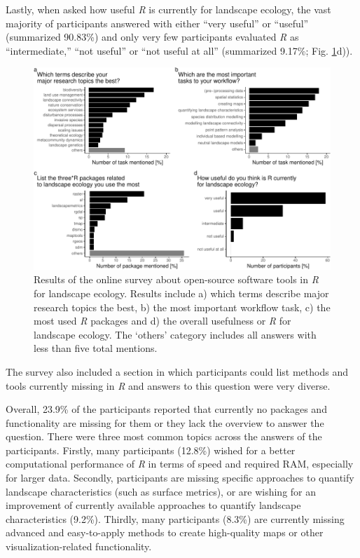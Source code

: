\documentclass[smallextended]{svjour3}       %
\begin{document}
Lastly, when asked how useful \emph{R} is currently for landscape ecology, the vast majority of participants answered with either ``very useful'' or ``useful'' (summarized 90.83\%) and only very few participants evaluated \emph{R} as ``intermediate,'' ``not useful'' or ``not useful at all'' (summarized 9.17\%; Fig. \ref{fig:fig-survey}d)).



\begin{figure}

{\centering \includegraphics[width=\textwidth]{paper_files/figure-latex/fig-survey-1} 

}

\caption{Results of the online survey about open-source software tools in \emph{R} for landscape ecology. Results include a) which terms describe major research topics the best, b) the most important workflow task, c) the most used \emph{R} packages and d) the overall usefulness or \emph{R} for landscape ecology. The `others' category includes all answers with less than five total mentions.}\label{fig:fig-survey}
\end{figure}

The survey also included a section in which participants could list methods and tools currently missing in \emph{R} and answers to this question were very diverse.

Overall, 23.9\% of the participants reported that currently no packages and functionality are missing for them or they lack the overview to answer the question.
There were three most common topics across the answers of the participants.
Firstly, many participants (12.8\%) wished for a better computational performance of \emph{R} in terms of speed and required RAM, especially for larger data.
Secondly, participants are missing specific approaches to quantify landscape characteristics (such as surface metrics), or are wishing for an improvement of currently available approaches to quantify landscape characteristics (9.2\%).
Thirdly, many participants (8.3\%) are currently missing advanced and easy-to-apply methods to create high-quality maps or other visualization-related functionality.
\end{document}
